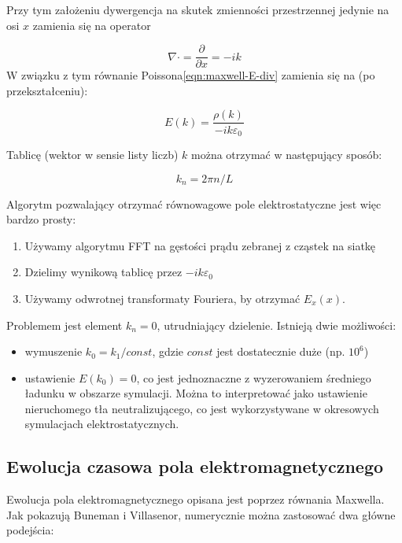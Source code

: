 Przy tym założeniu dywergencja na skutek zmienności przestrzennej jedynie na osi $x$
zamienia się na operator

\begin{equation}
\nabla \cdot = \frac{\partial}{\partial x} = -ik
\end{equation}
W związku z tym równanie Poissona\ref{eqn:maxwell-E-div} zamienia się na (po przekształceniu):

\begin{equation}
    E(k) = \frac{\rho(k)}{-ik \varepsilon_0}
\end{equation}

Tablicę (wektor w sensie listy liczb) $k$ można otrzymać w następujący sposób:

\begin{equation}
    k_n = 2 \pi n / L
\end{equation}


Algorytm pozwalający otrzymać równowagowe pole elektrostatyczne jest więc bardzo prosty:
\begin{enumerate}
\item Używamy algorytmu FFT na gęstości prądu zebranej z cząstek na siatkę
\item Dzielimy wynikową tablicę przez $-ik \varepsilon_0$
\item Używamy odwrotnej transformaty Fouriera, by otrzymać $E_x(x)$.
\end{enumerate}

Problemem jest element $k_n = 0$, utrudniający dzielenie. Istnieją dwie możliwości:
\begin{itemize}
\item wymuszenie $k_0 = k_1 / const$, gdzie $const$ jest dostatecznie duże (np. $10^6$)
\item ustawienie $E(k_0) = 0$, co jest jednoznaczne z wyzerowaniem średniego ładunku w
obszarze symulacji. Można to interpretować jako ustawienie nieruchomego tła neutralizującego,
co jest wykorzystywane w okresowych symulacjach elektrostatycznych.
\end{itemize}
\subsection{Ewolucja czasowa pola elektromagnetycznego}

Ewolucja pola elektromagnetycznego opisana jest poprzez równania Maxwella.
Jak pokazują Buneman i Villasenor, numerycznie można zastosować dwa główne
podejścia: \cite{bunemanvillasenor}

